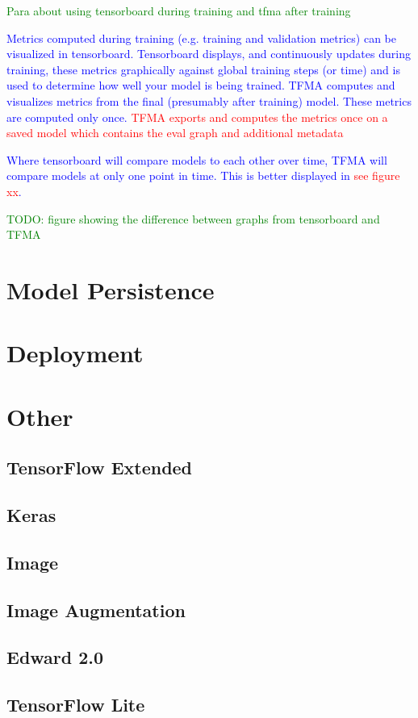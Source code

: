 \textcolor{green}{Para about using tensorboard during training and tfma after training}

\textcolor{blue}{Metrics computed during training (e.g. training and validation metrics) can be visualized in tensorboard. Tensorboard displays, and continuously updates during training, these metrics graphically against global training steps (or time) and is used to determine how well your model is being trained. TFMA computes and visualizes metrics from the final (presumably after training) model. These metrics are computed only once. \textcolor{red}{TFMA exports and computes the metrics once on a saved model which contains the eval graph and additional metadata}}

\textcolor{blue}{Where tensorboard will compare models to each other over time, TFMA will compare models at only one point in time. This is better displayed in \textcolor{red}{see figure xx}.}

\textcolor{green}{TODO: figure showing the difference between graphs from tensorboard and TFMA}








\section{Model Persistence}






\section{Deployment}




\section{Other}



\subsection{TensorFlow Extended}

\subsection{Keras}

\subsection{Image}

\subsection{Image Augmentation}

\subsection{Edward 2.0}

\subsection{TensorFlow Lite}
